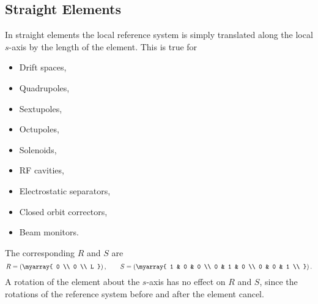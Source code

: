 \subsection{Straight Elements}
In straight elements the local reference system is simply
translated along the local \(s\)-axis by the length of the
element.
This is true for
\begin{itemize}
\item Drift spaces,
\item Quadrupoles,
\item Sextupoles,
\item Octupoles,
\item Solenoids,
\item RF cavities,
\item Electrostatic separators,
\item Closed orbit correctors,
\item Beam monitors.
\end{itemize}
The corresponding \(R\) and \(S\) are
\[
   R=\left(\myarray{
      0 \\
      0 \\
      L
   }\right),
   \qquad
   S=\left(\myarray{
      1 & 0 & 0 \\
      0 & 1 & 0 \\
      0 & 0 & 1 \\
   }\right).
\]
A rotation of the element about the \(s\)-axis has no effect
on \(R\) and \(S\),
since the rotations of the reference system before and after the
element cancel.

